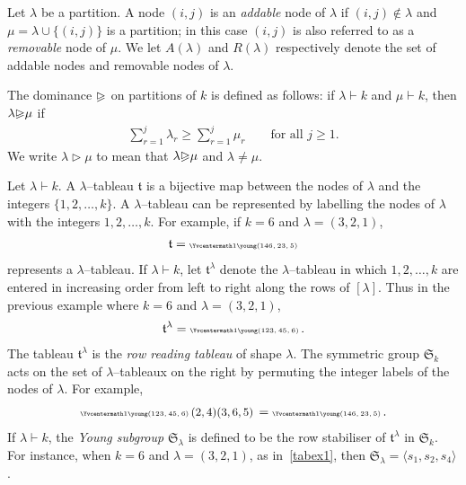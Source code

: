 \documentclass[11pt,a4paper,reqno,svgnames]{amsart}
\theoremstyle{plain}
\theoremstyle{definition}
\numberwithin{equation}{section}
\begin{document}
Let $\lambda$ be  a partition. A node $(i,j)$ is an \emph{addable} node of $\lambda$ if $(i,j)\not\in\lambda$ and 
$\mu=\lambda \cup{\lbrace}(i,j){\rbrace}$ is a partition; in this case $(i,j)$ is also referred to as a \emph{removable} node of $\mu$. We let $A(\lambda)$ and $R(\lambda)$ respectively denote the set of addable nodes and removable nodes of $\lambda$.

The dominance ${\trianglerighteqslant}$ on partitions of $k$ is defined as follows: if $\lambda\vdash k$ and $\mu\vdash k$, then $\lambda{\trianglerighteqslant}\mu$ if
\begin{align*}
\textstyle\sum_{r=1}^j\lambda_r{\geqslant}\sum_{r=1}^j\mu_r \qquad\text{for all $j{\geqslant} 1$.}
\end{align*}
We write $\lambda\rhd\mu$ to mean that $\lambda{\trianglerighteqslant}\mu$ and $\lambda\ne\mu$. 

Let $\lambda\vdash k$. A $\lambda$--tableau $\mathfrak{t}$ is a bijective map between the nodes of  $\lambda$ and the integers $\{1,2,\dots,k\}$.
A  $\lambda$--tableau  can be represented by labelling the nodes of $\lambda$ with the integers $1,2,\dots,k$. For example, if $k=6$ and $\lambda=(3,2,1)$,
\begin{align}\label{tabex0.0}
\mathfrak{t}=\text{\tiny\Yvcentermath1$\young(146,23,5)$}
\end{align}
represents a $\lambda$--tableau. 
If $\lambda\vdash k$, let $\mathfrak{t}^\lambda$ denote the
$\lambda$--tableau in which $1,2,\dots,k$ are
entered in increasing order from left to right along the rows of
$[\lambda]$. Thus in the previous example where $k=6$ and
$\lambda=(3,2,1)$,
\begin{align}\label{tabex1}
\mathfrak{t}^\lambda=\text{\tiny\Yvcentermath1$\young(123,45,6)$}\,.
\end{align}
The tableau $\mathfrak{t}^\lambda$ is the \emph{row reading tableau} of shape $\lambda$. 
The symmetric group $\mathfrak{S}_k$ acts on the set of
$\lambda$--tableaux on the right by permuting
the integer labels of the nodes of $\lambda$. For example,
\begin{align*}
\text{\tiny\Yvcentermath1$\young(123,45,6)$}\,\text{\small$(2,4)(3,6,5)$}\,
=\text{\tiny\Yvcentermath1$\young(146,23,5)$} \,.
\end{align*}
If $\lambda\vdash k$, the \emph{Young subgroup} $\mathfrak{S}_\lambda$ is defined to be the
row stabiliser of $\mathfrak{t}^\lambda$ in $\mathfrak{S}_{k}$.
For instance, when $k=6$ and $\lambda=(3,2,1)$, as
in~\eqref{tabex1}, then $\mathfrak{S}_\lambda=\langle
s_1,s_2,s_4\rangle$. 
\end{document}
